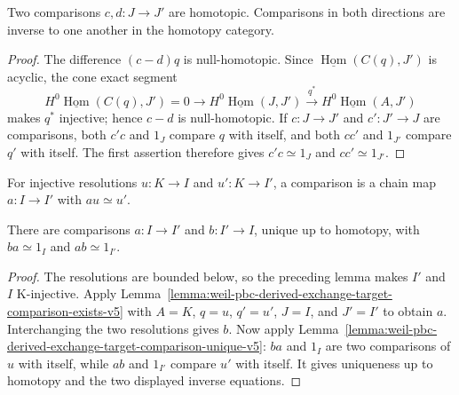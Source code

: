 \begin{lemma}
\label{lemma:weil-pbc-derived-exchange-target-comparison-unique-v5}
Two comparisons $c,d:J\to J'$ are homotopic.  Comparisons in both directions
are inverse to one another in the homotopy category.
\end{lemma}
\begin{proof}
The difference $(c-d)q$ is null-homotopic.  Since
$\underline{\operatorname{Hom}}(C(q),J')$ is acyclic, the cone exact segment
\[
 H^0\underline{\operatorname{Hom}}(C(q),J')=0\longrightarrow
 H^0\underline{\operatorname{Hom}}(J,J')\xrightarrow{q^*}
 H^0\underline{\operatorname{Hom}}(A,J')
\]
makes $q^*$ injective; hence $c-d$ is null-homotopic.  If
$c:J\to J'$ and $c':J'\to J$ are comparisons, both $c'c$ and $1_J$ compare
$q$ with itself, and both $cc'$ and $1_{J'}$ compare $q'$ with itself.
The first assertion therefore gives $c'c\simeq1_J$ and $cc'\simeq1_{J'}$.
\end{proof}

\begin{definition}
\label{def:weil-pbc-derived-exchange-source-comparison-v5}
For injective resolutions $u:K\to I$ and $u':K\to I'$, a comparison is a
chain map $a:I\to I'$ with $au\simeq u'$.
\end{definition}

\begin{lemma}
\label{lemma:weil-pbc-derived-exchange-source-comparison-v5}
There are comparisons $a:I\to I'$ and $b:I'\to I$, unique up to homotopy,
with $ba\simeq1_I$ and $ab\simeq1_{I'}$.
\end{lemma}
\begin{proof}
The resolutions are bounded below, so the preceding lemma makes $I'$ and $I$
K-injective.  Apply
Lemma~\ref{lemma:weil-pbc-derived-exchange-target-comparison-exists-v5}
with $A=K$, $q=u$, $q'=u'$, $J=I$, and $J'=I'$ to obtain $a$.
Interchanging the two resolutions gives $b$.  Now apply
Lemma~\ref{lemma:weil-pbc-derived-exchange-target-comparison-unique-v5}:
$ba$ and $1_I$ are two comparisons of $u$ with itself, while $ab$ and
$1_{I'}$ compare $u'$ with itself.  It gives uniqueness up to homotopy and
the two displayed inverse equations.
\end{proof}

